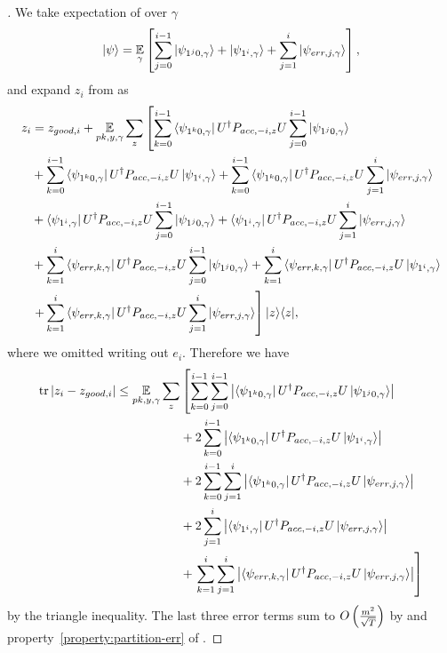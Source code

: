 \begin{proof}[]
	We take expectation of  over $\gamma$
	$$\ket{\psi}=\operatorname*{\mathbb{E}}_{\gamma}\left[
		\sum_{j=0}^{i-1} \ket{\psi_{1^j0,\gamma}} +\ket{\psi_{1^i,\gamma}} +\sum_{j=1}^{i}\ket{\psi_{err,j,\gamma}}
	\right],$$
	and expand $z_i$ from  as
	\begin{align}
		z_i &= z_{good,i}+ \operatorname*{\mathbb{E}}_{pk, y, \gamma} \sum_z \left[\sum_{k=0}^{i-1} \bra{\psi_{1^k0,\gamma}}U^\dag  P_{acc,-i,z}U   \sum_{j=0}^{i-1} \ket{\psi_{1^j0,\gamma}} \right. \nonumber \\
		&+
		\sum_{k=0}^{i-1} \bra{\psi_{1^k0,\gamma}}U^\dag  P_{acc,-i,z}U \ket{\psi_{1^i,\gamma}} +\sum_{k=0}^{i-1} \bra{\psi_{1^k0,\gamma}}U^\dag  P_{acc,-i,z}U\sum_{j=1}^{i}\ket{\psi_{err,j,\gamma}} \nonumber \\
		&+\bra{\psi_{1^i,\gamma}} U^\dag  P_{acc,-i,z}U \sum_{j=0}^{i-1} \ket{\psi_{1^j0,\gamma}} +\bra{\psi_{1^i,\gamma}} U^\dag  P_{acc,-i,z}U \sum_{j=1}^{i}\ket{\psi_{err,j,\gamma}}
		\nonumber \\
		&+ \sum_{k=1}^{i}\bra{\psi_{err,k,\gamma}} U^\dag  P_{acc,-i,z}U  \sum_{j=0}^{i-1} \ket{\psi_{1^j0,\gamma}} + \sum_{k=1}^{i}\bra{\psi_{err,k,\gamma}} U^\dag  P_{acc,-i,z}U \ket{\psi_{1^i,\gamma}}
		\nonumber \\
		&\left.    +\sum_{k=1}^{i}\bra{\psi_{err,k,\gamma}} U^\dag  P_{acc,-i,z}U \sum_{j=1}^{i}\ket{\psi_{err,j,\gamma}} \right] |z\rangle\langle z| , \nonumber     
	\end{align}
	where we omitted writing out $e_i$.
	Therefore we have
	\begin{align*}
		\operatorname{tr}|z_i-z_{good,i}|\leq \operatorname*{\mathbb{E}}_{pk, y, \gamma} \sum_z &\left[ \sum_{k=0}^{i-1} \sum_{j=0}^{i-1} \left| \bra{\psi_{1^k0,\gamma}}U^\dag  P_{acc,-i,z}U \ket{\psi_{1^j0,\gamma}} \right|\right.\\
		&+
		2 \sum_{k=0}^{i-1} \left|\bra{\psi_{1^k0,\gamma}}U^\dag  P_{acc,-i,z}U \ket{\psi_{1^i,\gamma}} \right| \\
		&+ 2 \sum_{k=0}^{i-1}\sum_{j=1}^{i}\left| \bra{\psi_{1^k0,\gamma}}U^\dag  P_{acc,-i,z}U\ket{\psi_{err,j,\gamma}}\right| \\   
		&+2 \sum_{j=1}^{i}\left|\bra{\psi_{1^i,\gamma}} U^\dag  P_{acc,-i,z}U \ket{\psi_{err,j,\gamma}}\right| \\
		&+\left. \sum_{k=1}^{i}\sum_{j=1}^{i}\left| \bra{\psi_{err,k,\gamma}} U^\dag  P_{acc,-i,z}U \ket{\psi_{err,j,\gamma}}\right| \right]
	\end{align*}
	by the triangle inequality.
	The last three error terms sum to $O\left(\frac{m^2}{\sqrt{T}}\right)$ by  and property~\ref{property:partition-err} of .

\end{proof}
